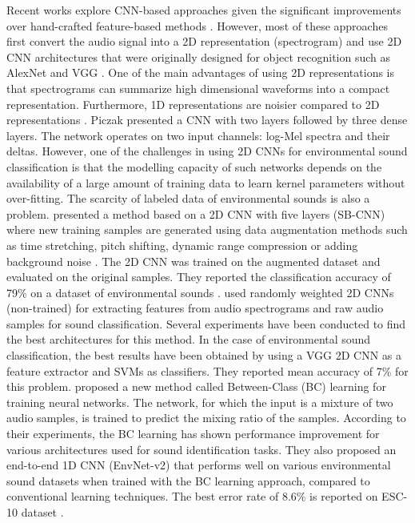 \documentclass[preprint,final,12pt]{elsarticle}
\begin{document}
Recent works explore CNN-based approaches given the significant improvements over hand-crafted feature-based methods \citep{piczak2015environmental,2017deepsalamon,pons2018randomly,simonyan2014very, tokozume2017learning}. However, most of these approaches first convert the audio signal into a 2D representation (spectrogram) and use 2D CNN architectures that were originally designed for object recognition such as AlexNet and VGG \citep{simonyan2014very}. One of the main advantages of using 2D representations is that spectrograms can summarize high dimensional waveforms into a compact representation. Furthermore, 1D representations are noisier compared to 2D representations \citep{stowell2014}. Piczak \citep{piczak2015environmental} presented a CNN with two layers followed by three dense layers. The network operates on two input channels: log-Mel spectra and their deltas. However, one of the challenges in using 2D CNNs for environmental sound classification is that the modelling capacity of such networks depends on the availability of a large amount of training data to learn kernel parameters without over-fitting. The scarcity of labeled data of environmental sounds is also a problem. \citet{2017deepsalamon} presented a method based on a 2D CNN with five layers (SB-CNN) where new training samples are generated using data augmentation methods such as time stretching, pitch shifting, dynamic range compression or adding background noise \citep{mcfee2015MUDA}. The 2D CNN was trained on the augmented dataset and evaluated on the original samples. They reported the classification accuracy of 79\% on a dataset of environmental sounds \citep{Salamon:2014:DTU:2647868.2655045}. \citet{pons2018randomly} used randomly weighted 2D CNNs (non-trained) for extracting features from audio spectrograms and raw audio samples for sound classification. Several experiments have been conducted to find the best architectures for this method. In the case of environmental sound classification, the best results have been obtained by using a VGG 2D CNN \citep{simonyan2014very} as a feature extractor and SVMs as classifiers. They reported mean accuracy of 7\% for this problem. \citet{tokozume2017learning} proposed a new method called Between-Class (BC) learning for training neural networks. The network, for which the input is a mixture of two audio samples, is trained to predict the mixing ratio of the samples. According to their experiments, the BC learning has shown performance improvement for various architectures used for sound identification tasks. They also proposed an end-to-end 1D CNN (EnvNet-v2) that performs well on various environmental sound datasets when trained with the BC learning approach, compared to conventional learning techniques. The best error rate of 8.6\% is reported on ESC-10 dataset \citep{piczak2015esc}.   
\end{document}
